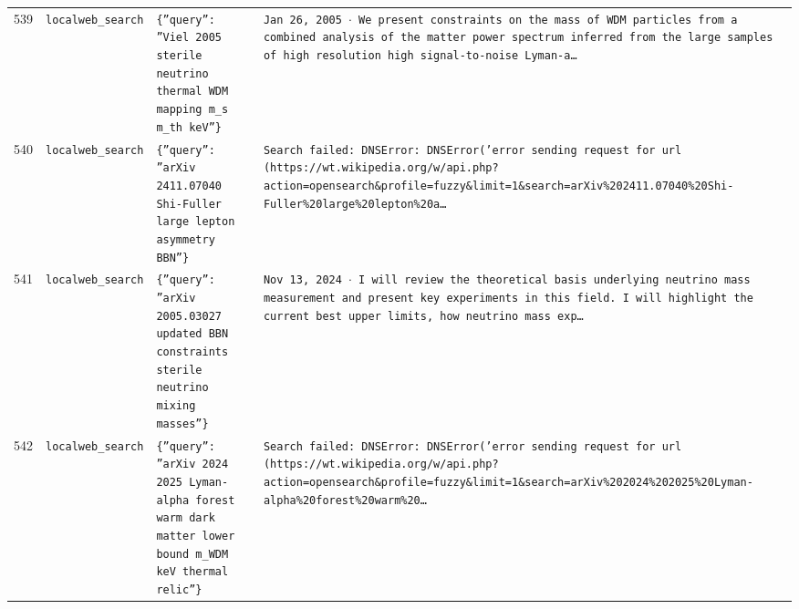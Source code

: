\documentclass[11pt,a4paper]{article}
\begin{document}
\begin{longtable}{@{}p{}p{}p{}p{}@{}}
539 & \texttt{local}\newline\texttt{web\_\allowbreak{}search} & \texttt{\{''query'':\allowbreak{} ''Viel 2005 sterile neutrino thermal WDM mapping m\_\allowbreak{}s m\_\allowbreak{}th keV''\}\allowbreak{}} & \texttt{Jan 26,\allowbreak{} 2005 $\cdot$ We present constraints on the mass of WDM particles from a combined analysis of the matter power spectrum inferred from the large samples of high resolution high signal-to-noise Lyman-a\ldots{}\allowbreak{}} \\
540 & \texttt{local}\newline\texttt{web\_\allowbreak{}search} & \texttt{\{''query'':\allowbreak{} ''arXiv 2411.07040 Shi-Fuller large lepton asymmetry BBN''\}\allowbreak{}} & \texttt{Search failed:\allowbreak{} DNSError:\allowbreak{} DNSError('error sending request for url (https:\allowbreak{}/\allowbreak{}/\allowbreak{}wt.wikipedia.org/\allowbreak{}w/\allowbreak{}api.php?action=\allowbreak{}opensearch\&profile=\allowbreak{}fuzzy\&limit=\allowbreak{}1\&search=\allowbreak{}arXiv\%202411.07040\%20Shi-Fuller\%20large\%20lepton\%20a\ldots{}\allowbreak{}} \\
541 & \texttt{local}\newline\texttt{web\_\allowbreak{}search} & \texttt{\{''query'':\allowbreak{} ''arXiv 2005.03027 updated BBN constraints sterile neutrino mixing masses''\}\allowbreak{}} & \texttt{Nov 13,\allowbreak{} 2024 $\cdot$ I will review the theoretical basis underlying neutrino mass measurement and present key experiments in this field. I will highlight the current best upper limits,\allowbreak{} how neutrino mass exp\ldots{}\allowbreak{}} \\
542 & \texttt{local}\newline\texttt{web\_\allowbreak{}search} & \texttt{\{''query'':\allowbreak{} ''arXiv 2024 2025 Lyman-alpha forest warm dark matter lower bound m\_\allowbreak{}WDM keV thermal relic''\}\allowbreak{}} & \texttt{Search failed:\allowbreak{} DNSError:\allowbreak{} DNSError('error sending request for url (https:\allowbreak{}/\allowbreak{}/\allowbreak{}wt.wikipedia.org/\allowbreak{}w/\allowbreak{}api.php?action=\allowbreak{}opensearch\&profile=\allowbreak{}fuzzy\&limit=\allowbreak{}1\&search=\allowbreak{}arXiv\%202024\%202025\%20Lyman-alpha\%20forest\%20warm\%20\ldots{}\allowbreak{}} \\

\end{longtable}
\end{document}
